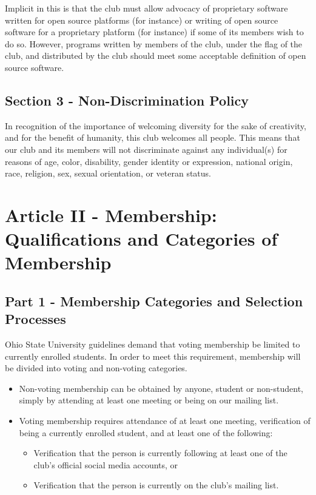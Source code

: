 \documentclass{article}
\begin{document}
	Implicit in this is that the club must allow advocacy of proprietary software written for open source platforms (for instance) or writing of open source software for a proprietary platform (for instance) if some of its members wish to do so. However, programs written by members of the club, under the flag of the club, and distributed by the club should meet some acceptable definition of open source software.

	\subsection{Section 3 - Non-Discrimination Policy}

	In recognition of the importance of welcoming diversity for the sake of creativity, and for the benefit of humanity, this club welcomes all people. This means that our club and its members will not discriminate against any individual(s) for reasons of age, color, disability, gender identity or expression, national origin, race, religion, sex, sexual orientation, or veteran status.

	\section{Article II - Membership: Qualifications and Categories of Membership}

	\subsection{Part 1 - Membership Categories and Selection Processes}
	Ohio State University guidelines demand that voting membership be limited to currently enrolled students.  In order to meet this requirement, membership will be divided into voting and non-voting categories.

	\begin{itemize}
		\item Non-voting membership can be obtained by anyone, student or non-student, simply by attending at least one meeting or being on our mailing list.
		\item Voting membership requires attendance of at least one meeting, verification of being a currently enrolled student, and at least one of the following:
		\begin{itemize}
			\item Verification that the person is currently following at least one of the club's official social media accounts, or
			\item Verification that the person is currently on the club's mailing list.
		\end{itemize}
	\end{itemize}
\end{document}

